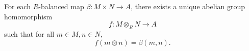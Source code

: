 For each $R$-balanced map $\beta: M \times N \to A$, there exists a unique abelian group homomorphism
$$f: M \otimes_R N \to A$$
such that for all $m \in M, n \in N$,
$$f(m \otimes n) = \beta(m, n).$$
